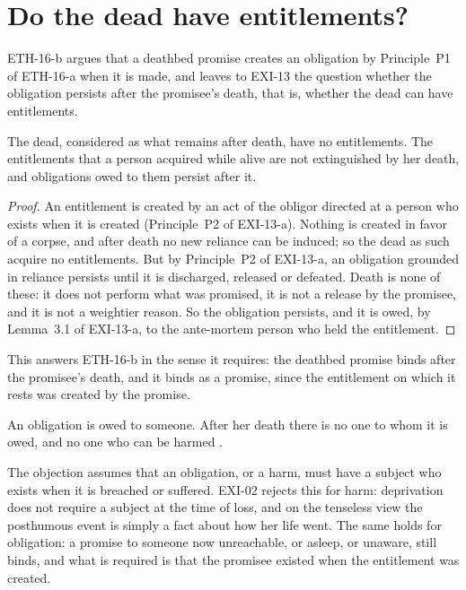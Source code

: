 \documentclass{situationist-preprint}
\begin{document}
\section{Do the dead have entitlements?}

ETH-16-b argues that a deathbed promise creates an obligation by Principle~P1 of ETH-16-a when it is made, and leaves to EXI-13 the question whether the obligation persists after the promisee's death, that is, whether the dead can have entitlements.

\begin{proposition}\label{p:entitle}
The dead, considered as what remains after death, have no entitlements. The entitlements that a person acquired while alive are not extinguished by her death, and obligations owed to them persist after it.
\end{proposition}

\begin{proof}
An entitlement is created by an act of the obligor directed at a person who exists when it is created (Principle~P2 of EXI-13-a). Nothing is created in favor of a corpse, and after death no new reliance can be induced; so the dead as such acquire no entitlements. But by Principle~P2 of EXI-13-a, an obligation grounded in reliance persists until it is discharged, released or defeated. Death is none of these: it does not perform what was promised, it is not a release by the promisee, and it is not a weightier reason. So the obligation persists, and it is owed, by Lemma~3.1 of EXI-13-a, to the ante-mortem person who held the entitlement.
\end{proof}

This answers ETH-16-b in the sense it requires: the deathbed promise binds after the promisee's death, and it binds as a promise, since the entitlement on which it rests was created by the promise.

\begin{objection}
An obligation is owed to someone. After her death there is no one to whom it is owed, and no one who can be harmed \citep{Taylor2005}.
\end{objection}

\begin{reply}
The objection assumes that an obligation, or a harm, must have a subject who exists when it is breached or suffered. EXI-02 rejects this for harm: deprivation does not require a subject at the time of loss, and on the tenseless view the posthumous event is simply a fact about how her life went. The same holds for obligation: a promise to someone now unreachable, or asleep, or unaware, still binds, and what is required is that the promisee existed when the entitlement was created.
\end{reply}
\end{document}
